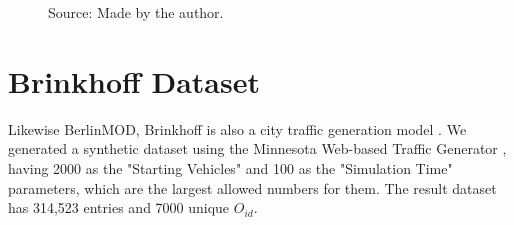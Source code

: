 {\begin{figure}[h!]
\begin{subfigure}[t]{0.48\textwidth}
        \label{fig:tdrive_disks}
    \end{subfigure}
    \footnotesize{Source: Made by the author.}
    \label{fig:tdrive_results2}
\end{figure}

\section{Brinkhoff Dataset}
\label{sec:brinkhoff}
Likewise BerlinMOD, Brinkhoff is also a city traffic generation model \citep{brinkhoffpaper}. We generated a synthetic
dataset using the Minnesota Web-based Traffic Generator \citep{mntg}, having 2000 as the "Starting Vehicles" and 100 as
the "Simulation Time" parameters, which are the largest allowed numbers for them. The result dataset has 314,523 entries
and 7000 unique $O_{id}$.

}
